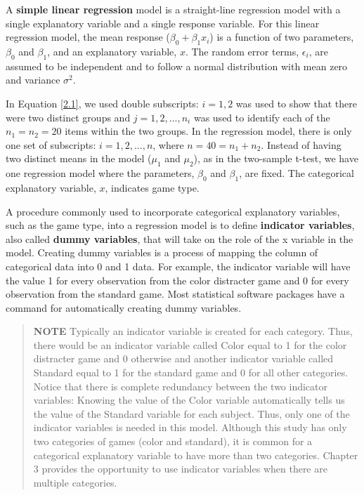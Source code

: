 \documentclass[
]{report}
\begin{document}
A \textbf{simple linear regression} model is a straight-line regression model with a single explanatory variable and a single response variable. For this linear regression model, the mean response (\(\beta_0 + \beta_1x_i\)) is a function of two parameters, \(\beta_0\) and \(\beta_1\), and an explanatory variable, \(x\). The random error terms, \(\epsilon_i\), are assumed to be independent and to follow a normal distribution with mean zero and variance \(\sigma^2\).

In Equation \ref{2.1}, we used double subscripts: \(i = 1, 2\) was used to show that there were two distinct groups and \(j = 1, 2, ... , n_i\) was used to identify each of the \(n_1 = n_2 = 20\) items within the two groups. In the regression model, there is only one set of subscripts: \(i = 1, 2, ..., n\), where \(n = 40 = n_1 + n_2\). Instead of having two distinct means in the model (\(\mu_1\) and \(\mu_2\)), as in the two-sample t-test, we have one regression model where the parameters, \(\beta_0\) and \(\beta_1\), are fixed. The categorical explanatory variable, \(x\), indicates game type.

A procedure commonly used to incorporate categorical explanatory variables, such as the game type, into a regression model is to define \textbf{indicator variables}, also called \textbf{dummy variables}, that will take on the role of the x variable in the model. Creating dummy variables is a process of mapping the column of categorical data into 0 and 1 data. For example, the indicator variable will have the value 1 for every observation from the color distracter game and 0 for every observation from the standard game. Most statistical software packages have a command for automatically creating dummy variables.

\begin{quote}
\textbf{NOTE}
Typically an indicator variable is created for each category. Thus, there would be an indicator variable called Color equal to 1 for the color distracter game and 0 otherwise and another indicator variable called Standard equal to 1 for the standard game and 0 for all other categories. Notice that there is complete redundancy between the two indicator variables: Knowing the value of the Color variable automatically tells us the value of the Standard variable for each subject. Thus, only one of the indicator variables is needed in this model. Although this study has only two categories of games (color and standard), it is common for a categorical explanatory variable to have more than two categories. Chapter 3 provides the opportunity to use indicator variables when there are multiple categories.
\end{quote}
\end{document}
